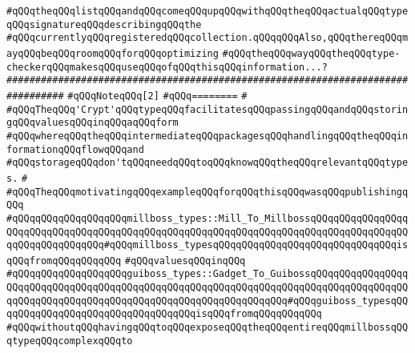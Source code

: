 \verb|#qQQqtheqQQqlistqQQqandqQQqcomeqQQqupqQQqwithqQQqtheqQQqactualqQQqtypeqQQqsignatureqQQqdescribingqQQqthe|\newline
\verb|#qQQqcurrentlyqQQqregisteredqQQqcollection.qQQqqQQqAlso,qQQqthereqQQqmayqQQqbeqQQqroomqQQqforqQQqoptimizing|\newline
\verb|#qQQqtheqQQqwayqQQqtheqQQqtype-checkerqQQqmakesqQQquseqQQqofqQQqthisqQQqinformation...?|\newline
\newline
\newline
\newline
\verb|################################################################################|\newline
\verb|#qQQqNoteqQQq[2]|\newline
\verb|#qQQq========|\newline
\verb|#|\newline
\verb|#qQQqTheqQQq'Crypt'qQQqtypeqQQqfacilitatesqQQqpassingqQQqandqQQqstoringqQQqvaluesqQQqinqQQqaqQQqform|\newline
\verb|#qQQqwhereqQQqtheqQQqintermediateqQQqpackagesqQQqhandlingqQQqtheqQQqinformationqQQqflowqQQqand|\newline
\verb|#qQQqstorageqQQqdon'tqQQqneedqQQqtoqQQqknowqQQqtheqQQqrelevantqQQqtypes.|\newline
\verb|#|\newline
\verb|#qQQqTheqQQqmotivatingqQQqexampleqQQqforqQQqthisqQQqwasqQQqpublishingqQQq|\newline
\verb|#qQQqqQQqqQQqqQQqqQQqmillboss_types::Mill_To_MillbossqQQqqQQqqQQqqQQqqQQqqQQqqQQqqQQqqQQqqQQqqQQqqQQqqQQqqQQqqQQqqQQqqQQqqQQqqQQqqQQqqQQqqQQqqQQqqQQqqQQqqQQq#qQQqmillboss_typesqQQqqQQqqQQqqQQqqQQqqQQqqQQqqQQqisqQQqfromqQQqqQQqqQQq|\newline
\verb|#qQQqvaluesqQQqinqQQq|\newline
\verb|#qQQqqQQqqQQqqQQqqQQqguiboss_types::Gadget_To_GuibossqQQqqQQqqQQqqQQqqQQqqQQqqQQqqQQqqQQqqQQqqQQqqQQqqQQqqQQqqQQqqQQqqQQqqQQqqQQqqQQqqQQqqQQqqQQqqQQqqQQqqQQqqQQqqQQqqQQqqQQqqQQqqQQqqQQqqQQq#qQQqguiboss_typesqQQqqQQqqQQqqQQqqQQqqQQqqQQqqQQqqQQqisqQQqfromqQQqqQQqqQQq|\newline
\verb|#qQQqwithoutqQQqhavingqQQqtoqQQqexposeqQQqtheqQQqentireqQQqmillbossqQQqtypeqQQqcomplexqQQqto|\newline
